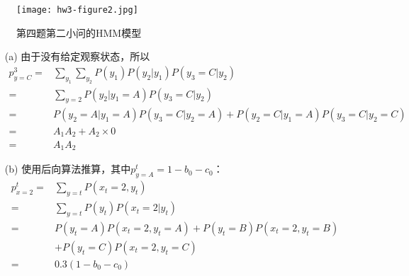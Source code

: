 \begin{problem}
\begin{enumerate}
\begin{figure}[h]
    \centering
    \texttt{[image: hw3-figure2.jpg]}
    \caption{第四题第二小问的HMM模型}
    \label{hw3-figure2}
\end{figure}
\begin{solution}
    \begin{enumerate}
        \item[(a)] 由于没有给定观察状态，所以
        \begin{align*}
            p_{y=C}^3 =& \sum_{y_1}\sum_{y_2} P(y_1)P(y_2|y_1)P(y_3=C|y_2)\\ 
            =& \sum_{y=2} P(y_2|y_1=A)P(y_3=C|y_2)\\
            =& P(y_2=A|y_1=A)P(y_3=C|y_2=A)+P(y_2=C|y_1=A)P(y_3=C|y_2=C)\\
            =& A_1 A_2 + A_2 \times 0\\
            =& A_1 A_2
        \end{align*}
        \item[(b)] 使用后向算法推算，其中$p_{y=A}^t=1-b_0-c_0$：
        \begin{align*}
            p_{x=2}^t =& \sum_{y=t}P(x_t=2,y_t)\\
            =& \sum_{y=t}P(y_t)P(x_t=2|y_t)\\
            =& P(y_t=A)P(x_t=2,y_t=A) + P(y_t=B)P(x_t=2,y_t=B) \\&+ P(y_t=C)P(x_t=2,y_t=C)\\
            =& 0.3(1-b_0-c_0)
        \end{align*} 
    \end{enumerate}
\end{solution}
\end{enumerate}
\end{problem}

